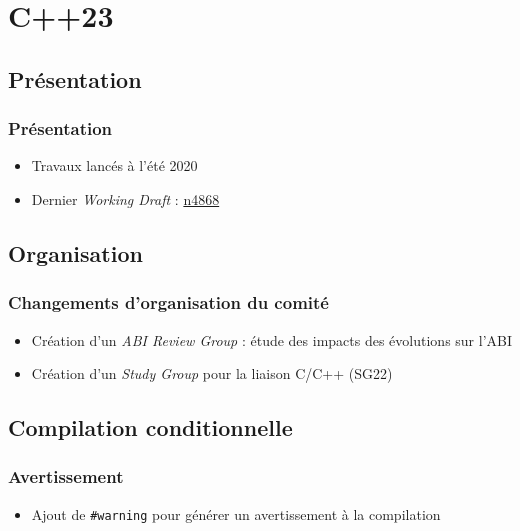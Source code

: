 \documentclass[C++.tex]{subfiles}
\begin{document}
\section{C++23}
\subsection*{Présentation}
\begin{frame}
	\frametitle{Présentation}
	\begin{itemize}
		\item Travaux lancés à l'été 2020
		\item Dernier \textit{Working Draft} : \href{https://github.com/cplusplus/draft/releases/download/n4868/n4868.pdf}{n4868}
	\end{itemize}
\end{frame}

\subsection*{Organisation}
\begin{frame}
	\frametitle{Changements d'organisation du comité}
	\begin{itemize}
		\item Création d'un \textit{ABI Review Group} : étude des impacts des évolutions sur l'ABI
		\item Création d'un \textit{Study Group} pour la liaison C/C++ (SG22)
	\end{itemize}
\end{frame}

\subsection*{Compilation conditionnelle}
\begin{frame}[fragile]
	\frametitle{Avertissement}
	\begin{itemize}
		\item Ajout de \lstinline|#warning| pour générer un avertissement à la compilation
		
	\end{itemize}
\end{frame}
\end{document}
